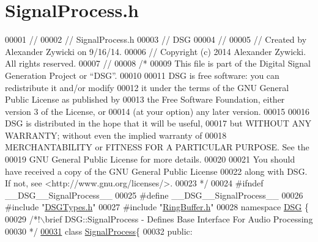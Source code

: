 \hypertarget{_signal_process_8h_source}{\section{Signal\+Process.\+h}
\label{_signal_process_8h_source}
}

\begin{DoxyCode}
00001 \textcolor{comment}{//}
00002 \textcolor{comment}{//  SignalProcess.h}
00003 \textcolor{comment}{//  DSG}
00004 \textcolor{comment}{//}
00005 \textcolor{comment}{//  Created by Alexander Zywicki on 9/16/14.}
00006 \textcolor{comment}{//  Copyright (c) 2014 Alexander Zywicki. All rights reserved.}
00007 \textcolor{comment}{//}
00008 \textcolor{comment}{/*}
00009 \textcolor{comment}{ This file is part of the Digital Signal Generation Project or “DSG”.}
00010 \textcolor{comment}{}
00011 \textcolor{comment}{ DSG is free software: you can redistribute it and/or modify}
00012 \textcolor{comment}{ it under the terms of the GNU General Public License as published by}
00013 \textcolor{comment}{ the Free Software Foundation, either version 3 of the License, or}
00014 \textcolor{comment}{ (at your option) any later version.}
00015 \textcolor{comment}{}
00016 \textcolor{comment}{ DSG is distributed in the hope that it will be useful,}
00017 \textcolor{comment}{ but WITHOUT ANY WARRANTY; without even the implied warranty of}
00018 \textcolor{comment}{ MERCHANTABILITY or FITNESS FOR A PARTICULAR PURPOSE.  See the}
00019 \textcolor{comment}{ GNU General Public License for more details.}
00020 \textcolor{comment}{}
00021 \textcolor{comment}{ You should have received a copy of the GNU General Public License}
00022 \textcolor{comment}{ along with DSG.  If not, see <http://www.gnu.org/licenses/>.}
00023 \textcolor{comment}{ */}
00024 \textcolor{preprocessor}{#ifndef \_\_DSG\_\_SignalProcess\_\_}
00025 \textcolor{preprocessor}{#define \_\_DSG\_\_SignalProcess\_\_}
00026 \textcolor{preprocessor}{#include "\hyperlink{_d_s_g_types_8h}{DSGTypes.h}"}
00027 \textcolor{preprocessor}{#include "\hyperlink{_ring_buffer_8h}{RingBuffer.h}"}
00028 \textcolor{keyword}{namespace }\hyperlink{namespace_d_s_g}{DSG} \{\textcolor{comment}{}
00029 \textcolor{comment}{    /*!\(\backslash\)brief DSG::SignalProcess - Defines Base Interface For Audio Processing}
00030 \textcolor{comment}{     */}
\hypertarget{_signal_process_8h_source_l00031}{}\hyperlink{class_d_s_g_1_1_signal_process}{00031}     \textcolor{keyword}{class }\hyperlink{class_d_s_g_1_1_signal_process}{SignalProcess}\{
00032     \textcolor{keyword}{public}:

\end{DoxyCode}
